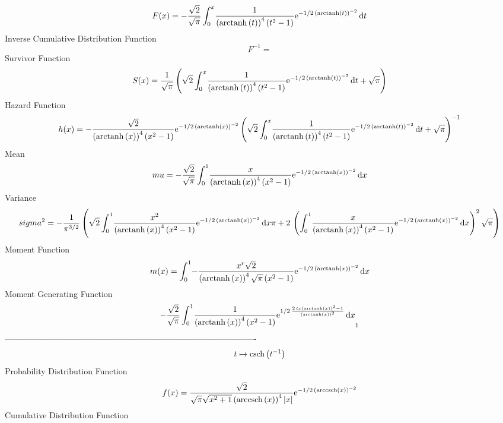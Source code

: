 \documentclass[12pt]{article}
\begin{document}
 $$F(x)=-{\frac {\sqrt {2}}{\sqrt {\pi}}\int_{0}^{x}\!{\frac {1}{ \left( 
{\rm arctanh} \left(t\right) \right) ^{4} \left( {t}^{2}-1 \right) }{
{\rm e}^{-1/2\, \left( {\rm arctanh} \left(t\right) \right) ^{-2}}}}
\,{\rm d}t}
$$ Inverse Cumulative Distribution Function 
  $$F^{-1} = $$Survivor Function 
 $$ S(x)={\frac {1}{\sqrt {\pi}} \left( \sqrt {2}\int_{0}^{x}\!{\frac {1}{
 \left( {\rm arctanh} \left(t\right) \right) ^{4} \left( {t}^{2}-1
 \right) }{{\rm e}^{-1/2\, \left( {\rm arctanh} \left(t\right)
 \right) ^{-2}}}}\,{\rm d}t+\sqrt {\pi} \right) }
$$ Hazard Function 
 $$ h(x)=-{\frac {\sqrt {2}}{ \left( {\rm arctanh} \left(x\right) \right) ^{4}
 \left( {x}^{2}-1 \right) }{{\rm e}^{-1/2\, \left( {\rm arctanh} 
\left(x\right) \right) ^{-2}}} \left( \sqrt {2}\int_{0}^{x}\!{\frac {1
}{ \left( {\rm arctanh} \left(t\right) \right) ^{4} \left( {t}^{2}-1
 \right) }{{\rm e}^{-1/2\, \left( {\rm arctanh} \left(t\right)
 \right) ^{-2}}}}\,{\rm d}t+\sqrt {\pi} \right) ^{-1}}
$$Mean 
 $$ mu=-{\frac {\sqrt {2}}{\sqrt {\pi}}\int_{0}^{1}\!{\frac {x}{ \left( 
{\rm arctanh} \left(x\right) \right) ^{4} \left( {x}^{2}-1 \right) }{
{\rm e}^{-1/2\, \left( {\rm arctanh} \left(x\right) \right) ^{-2}}}}
\,{\rm d}x}
$$ Variance 
 $$ sigma^2 = -{\frac {1}{{\pi}^{3/2}} \left( \sqrt {2}\int_{0}^{1}\!{\frac {{x}^{2}
}{ \left( {\rm arctanh} \left(x\right) \right) ^{4} \left( {x}^{2}-1
 \right) }{{\rm e}^{-1/2\, \left( {\rm arctanh} \left(x\right)
 \right) ^{-2}}}}\,{\rm d}x\pi+2\, \left( \int_{0}^{1}\!{\frac {x}{
 \left( {\rm arctanh} \left(x\right) \right) ^{4} \left( {x}^{2}-1
 \right) }{{\rm e}^{-1/2\, \left( {\rm arctanh} \left(x\right)
 \right) ^{-2}}}}\,{\rm d}x \right) ^{2}\sqrt {\pi} \right) }
$$Moment Function 
 $$ m(x) = \int_{0}^{1}\!-{\frac {{x}^{r}\sqrt {2}}{ \left( {\rm arctanh} \left(x
\right) \right) ^{4}\sqrt {\pi} \left( {x}^{2}-1 \right) }{{\rm e}^{-1
/2\, \left( {\rm arctanh} \left(x\right) \right) ^{-2}}}}\,{\rm d}x
$$ Moment Generating Function 
 $$-{\frac {\sqrt {2}}{\sqrt {\pi}}\int_{0}^{1}\!{\frac {1}{ \left( 
{\rm arctanh} \left(x\right) \right) ^{4} \left( {x}^{2}-1 \right) }{
{\rm e}^{1/2\,{\frac {2\,tx \left( {\rm arctanh} \left(x\right)
 \right) ^{2}-1}{ \left( {\rm arctanh} \left(x\right) \right) ^{2}}}}}
}\,{\rm d}x}_{{1}}
$$-------------------------------------------------------------------------------------------  \\$$t\mapsto {\rm csch} \left({t}^{-1}\right)
$$Probability Distribution Function 
$$  f(x)={\frac {\sqrt {2}}{\sqrt {\pi}\sqrt {{x}^{2}+1} \left( {\rm arccsch} 
\left(x\right) \right) ^{4} \left| x \right| }{{\rm e}^{-1/2\, \left( 
{\rm arccsch} \left(x\right) \right) ^{-2}}}}
$$Cumulative Distribution Function  
\end{document}
